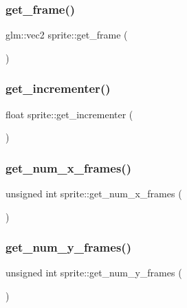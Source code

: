 \subsubsection{\texorpdfstring{get\+\_\+frame()}{get\_frame()}}
{\footnotesize\ttfamily glm\+::vec2 sprite\+::get\+\_\+frame (\begin{DoxyParamCaption}{ }\end{DoxyParamCaption})\hspace{0.3cm}{\ttfamily [inline]}}

\mbox{\label{classsprite_a34d638c04ee20e0640b121432a9b2bc2}} 
\subsubsection{\texorpdfstring{get\+\_\+incrementer()}{get\_incrementer()}}
{\footnotesize\ttfamily float sprite\+::get\+\_\+incrementer (\begin{DoxyParamCaption}{ }\end{DoxyParamCaption})\hspace{0.3cm}{\ttfamily [inline]}}

\mbox{\label{classsprite_aebcc7d599cc15c0257382d23ec5cf4c0}} 
\subsubsection{\texorpdfstring{get\+\_\+num\+\_\+x\+\_\+frames()}{get\_num\_x\_frames()}}
{\footnotesize\ttfamily unsigned int sprite\+::get\+\_\+num\+\_\+x\+\_\+frames (\begin{DoxyParamCaption}{ }\end{DoxyParamCaption})\hspace{0.3cm}{\ttfamily [inline]}}

\mbox{\label{classsprite_abc1ab26e93ef1343ca030a14a8b4d250}} 
\subsubsection{\texorpdfstring{get\+\_\+num\+\_\+y\+\_\+frames()}{get\_num\_y\_frames()}}
{\footnotesize\ttfamily unsigned int sprite\+::get\+\_\+num\+\_\+y\+\_\+frames (\begin{DoxyParamCaption}{ }\end{DoxyParamCaption})\hspace{0.3cm}{\ttfamily [inline]}}

